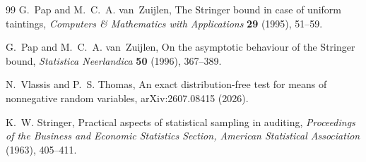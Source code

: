 \documentclass[11pt]{article}
\theoremstyle{definition}
\begin{document}
\begin{thebibliography}{99}
 G.~Pap and M.~C.~A. van~Zuijlen, The Stringer bound
in case of uniform taintings, \emph{Computers \& Mathematics with
Applications} \textbf{29} (1995), 51--59.

 G.~Pap and M.~C.~A. van~Zuijlen, On the asymptotic
behaviour of the Stringer bound, \emph{Statistica Neerlandica}
\textbf{50} (1996), 367--389.

 N.~Vlassis and P.~S. Thomas, An exact
distribution-free test for means of nonnegative random variables,
arXiv:2607.08415 (2026).

 K.~W. Stringer, Practical aspects of statistical
sampling in auditing, \emph{Proceedings of the Business and Economic
Statistics Section, American Statistical Association} (1963), 405--411.

\end{thebibliography}
\end{document}

